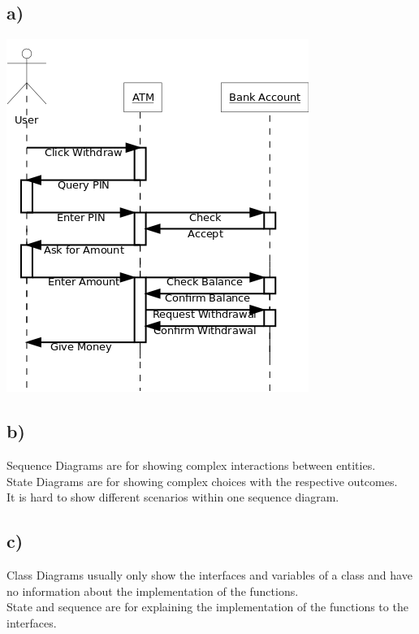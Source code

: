 \documentclass[a4paper,10pt]{scrartcl}[2003/01/01]
\begin{document}
        \subsection*{a)}
        \includegraphics[scale=0.5]{Diagram1}
        \subsection*{b)}
        Sequence Diagrams are for showing complex interactions between entities.\\
        State Diagrams are for showing complex choices with the respective outcomes.\\
        
        It is hard to show different scenarios within one sequence diagram.
        \subsection*{c)}
        Class Diagrams usually only show the interfaces and variables of a class and have no information about the implementation of the functions.\\
        State and sequence are for explaining the implementation of the functions to the interfaces.
\end{document}
